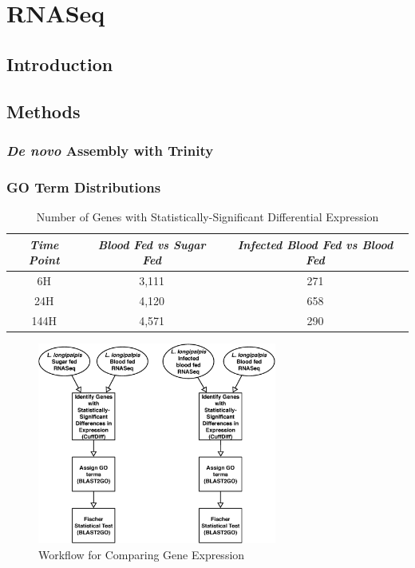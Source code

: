 \section{RNASeq}

\subsection{Introduction}

\subsection{Methods}

\subsubsection{\emph{De novo} Assembly with Trinity}

\subsubsection{GO Term Distributions}

\begin{table}[H]
  \centering
  \begin{tabular}{c c c} \hline
  \emph{Time Point} & \emph{Blood Fed vs Sugar Fed} & \emph{Infected Blood Fed vs Blood Fed} \\ \hline
  6H & 3,111 & 271 \\ \hline
  24H & 4,120 & 658 \\ \hline
  144H & 4,571 & 290 \\ \hline
  \end{tabular}
  \caption{Number of Genes with Statistically-Significant Differential Expression}
  \label{tab:stat-sig-genes}
\end{table}

\begin{figure}[H]
  \centering
  \includegraphics[width=0.7\textwidth]{figures/rnaseq/cuffdiff_workflow}
  \caption{Workflow for Comparing Gene Expression}
  \label{fig:rnaseq-cuffdiff-workflow}
\end{figure}

